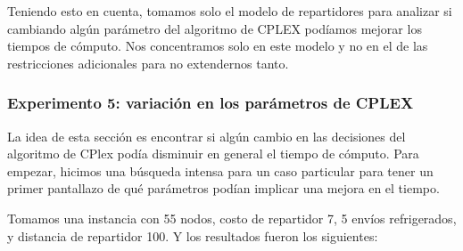 \documentclass{article}
\begin{document}
    Teniendo esto en cuenta, tomamos solo el modelo de repartidores para analizar si cambiando algún parámetro del algoritmo de CPLEX podíamos mejorar los tiempos de cómputo. Nos concentramos solo en este modelo y no en el de las restricciones adicionales para no extendernos tanto.

    
    \subsubsection{Experimento 5: variación en los parámetros de CPLEX}
    La idea de esta sección es encontrar si algún cambio en las decisiones del algoritmo de CPlex podía disminuir en general el tiempo de cómputo. Para empezar, hicimos una búsqueda intensa para un caso particular para tener un primer pantallazo de qué parámetros podían implicar una mejora en el tiempo.
    
    Tomamos una instancia con 55 nodos, costo de repartidor 7, 5 envíos refrigerados, y distancia de repartidor 100. Y los resultados fueron los siguientes:
    
    \begin{table}[H]
    \centering
    \caption{Comparación de tiempos según los parámetros de CPLEX}
    \end{table}
    
\end{document}

